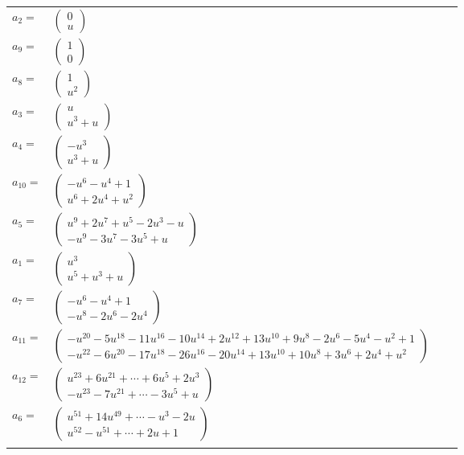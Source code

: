 \documentclass[1p]{elsarticle_modified}
\theoremstyle{definition}
\begin{document}
\begin{tabular}{m{7pt} m{180pt} m{7pt} m{180pt} }
\flushright $a_{2}=$&$\begin{pmatrix}0\\u\end{pmatrix}$ \\
\flushright $a_{9}=$&$\begin{pmatrix}1\\0\end{pmatrix}$ \\
\flushright $a_{8}=$&$\begin{pmatrix}1\\u^2\end{pmatrix}$ \\
\flushright $a_{3}=$&$\begin{pmatrix}u\\u^3+u\end{pmatrix}$ \\
\flushright $a_{4}=$&$\begin{pmatrix}- u^3\\u^3+u\end{pmatrix}$ \\
\flushright $a_{10}=$&$\begin{pmatrix}- u^6- u^4+1\\u^6+2 u^4+u^2\end{pmatrix}$ \\
\flushright $a_{5}=$&$\begin{pmatrix}u^9+2 u^7+u^5-2 u^3- u\\- u^9-3 u^7-3 u^5+u\end{pmatrix}$ \\
\flushright $a_{1}=$&$\begin{pmatrix}u^3\\u^5+u^3+u\end{pmatrix}$ \\
\flushright $a_{7}=$&$\begin{pmatrix}- u^6- u^4+1\\- u^8-2 u^6-2 u^4\end{pmatrix}$ \\
\flushright $a_{11}=$&$\begin{pmatrix}- u^{20}-5 u^{18}-11 u^{16}-10 u^{14}+2 u^{12}+13 u^{10}+9 u^8-2 u^6-5 u^4- u^2+1\\- u^{22}-6 u^{20}-17 u^{18}-26 u^{16}-20 u^{14}+13 u^{10}+10 u^8+3 u^6+2 u^4+u^2\end{pmatrix}$ \\
\flushright $a_{12}=$&$\begin{pmatrix}u^{23}+6 u^{21}+\cdots+6 u^5+2 u^3\\- u^{23}-7 u^{21}+\cdots-3 u^5+u\end{pmatrix}$ \\
\flushright $a_{6}=$&$\begin{pmatrix}u^{51}+14 u^{49}+\cdots- u^3-2 u\\u^{52}- u^{51}+\cdots+2 u+1\end{pmatrix}$\\&\end{tabular}
\end{document}
